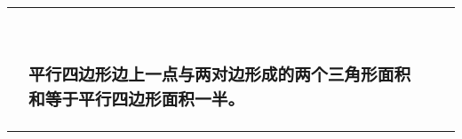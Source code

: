 \documentclass[a4paper,11pt,UTF8]{ctexart}
\begin{document}
\begin{longtable}[]{@{}llll@{}}
\toprule
\endhead
\begin{minipage}[t]{0.22\columnwidth}\raggedright
\hypertarget{section-1}{%
\subsubsection{}\label{section-1}}\strut
\end{minipage} & \begin{minipage}[t]{0.22\columnwidth}\raggedright
\hypertarget{section-2}{%
\subsubsection{}\label{section-2}}\strut
\end{minipage} & \begin{minipage}[t]{0.22\columnwidth}\raggedright
\hypertarget{section-3}{%
\subsubsection{}\label{section-3}}\strut
\end{minipage} & \begin{minipage}[t]{0.22\columnwidth}\raggedright
\hypertarget{section-4}{%
\subsubsection{}\label{section-4}}\strut
\end{minipage}\tabularnewline
\begin{minipage}[t]{0.22\columnwidth}\raggedright
\hypertarget{section-5}{%
\subsubsection{}\label{section-5}}

\hypertarget{section-6}{%
\subsubsection{}\label{section-6}}\strut
\end{minipage} & \begin{minipage}[t]{0.22\columnwidth}\raggedright
\hypertarget{ux5e73ux884cux56dbux8fb9ux5f62ux8fb9ux4e0aux4e00ux70b9ux4e0eux4e24ux5bf9ux8fb9ux5f62ux6210ux7684ux4e24ux4e2aux4e09ux89d2ux5f62ux9762ux79efux548cux7b49ux4e8eux5e73ux884cux56dbux8fb9ux5f62ux9762ux79efux4e00ux534a}{%
\subsubsection{平行四边形边上一点与两对边形成的两个三角形面积和等于平行四边形面积一半。}\label{ux5e73ux884cux56dbux8fb9ux5f62ux8fb9ux4e0aux4e00ux70b9ux4e0eux4e24ux5bf9ux8fb9ux5f62ux6210ux7684ux4e24ux4e2aux4e09ux89d2ux5f62ux9762ux79efux548cux7b49ux4e8eux5e73ux884cux56dbux8fb9ux5f62ux9762ux79efux4e00ux534a}}\strut
\end{minipage} & \begin{minipage}[t]{0.22\columnwidth}\raggedright
\hypertarget{section-7}{%
}
\end{minipage}
\end{longtable}
\end{document}

